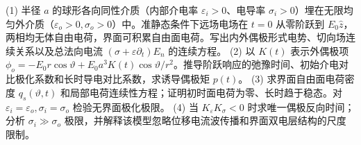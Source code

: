 (1) 半径 \(a\) 的球形各向同性介质（内部介电率 \(\varepsilon_i>0\)、电导率 \(\sigma_i>0\)）埋在无限均匀外介质（\(\varepsilon_o>0,\sigma_o>0\)）中。准静态条件下远场电场在 \(t=0\) 从零阶跃到 \(E_0\hat z\)，两相均无体自由电荷，界面可积累自由面电荷。写出内外偶极形式电势、切向场连续关系以及总法向电流 \((\sigma+\varepsilon\partial_t)E_n\) 的连续方程。
(2) 以 \(K(t)\) 表示外偶极项 \(\phi_o=-E_0r\cos\vartheta+E_0a^3K(t)\cos\vartheta/r^2\)。推导阶跃响应的弛豫时间、初始介电对比极化系数和长时导电对比系数，求诱导偶极矩 \(p(t)\)。
(3) 求界面自由面电荷密度 \(q_s(\vartheta,t)\) 和局部电荷连续性方程；证明初时面电荷为零、长时趋于稳态。对 \(\varepsilon_i=\varepsilon_o,\sigma_i=\sigma_o\) 检验无界面极化极限。
(4) 当 \(K_\varepsilon K_\sigma<0\) 时求唯一偶极反向时间；分析 \(\sigma_i\gg\sigma_o\) 极限，并解释该模型忽略位移电流波传播和界面双电层结构的尺度限制。
